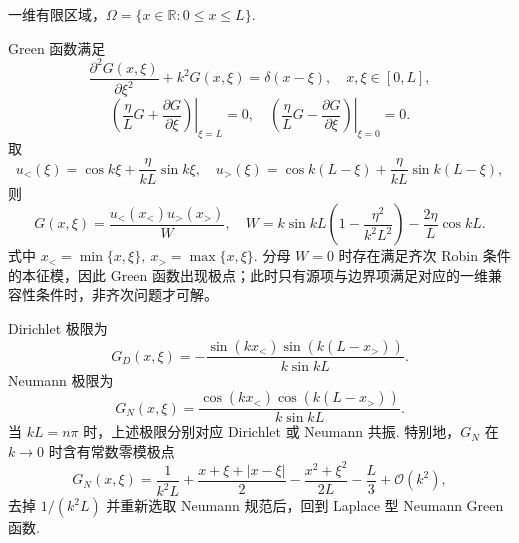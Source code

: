 \begin{example}
	一维有限区域，\(\Omega=\{x\in\mathbb{R}:0\leq x\leq L\}\).
	
	Green 函数满足
	\begin{equation*}
		\frac{\partial^2G(x,\xi)}{\partial\xi^2}+k^2G(x,\xi)=\delta(x-\xi),\quad x,\xi\in[0,L],
	\end{equation*}
	\begin{equation*}
		\left.\left(\frac{\eta}{L}G+\frac{\partial G}{\partial\xi}\right)\right|_{\xi=L}=0,
		\quad
		\left.\left(\frac{\eta}{L}G-\frac{\partial G}{\partial\xi}\right)\right|_{\xi=0}=0.
	\end{equation*}
	取
	\begin{equation*}
		u_<(\xi)=\cos k\xi+\frac{\eta}{kL}\sin k\xi,
		\quad
		u_>(\xi)=\cos k(L-\xi)+\frac{\eta}{kL}\sin k(L-\xi),
	\end{equation*}
	则
	\begin{equation*}
		G(x,\xi)=\frac{u_<(x_<)u_>(x_>)}{W},
		\quad
		W=k\sin kL\left(1-\frac{\eta^2}{k^2L^2}\right)-\frac{2\eta}{L}\cos kL.
	\end{equation*}
	式中 \(x_<=\min\{x,\xi\},\ x_>=\max\{x,\xi\}\). 分母 \(W=0\) 时存在满足齐次 Robin 条件的本征模，因此 Green 函数出现极点；此时只有源项与边界项满足对应的一维兼容性条件时，非齐次问题才可解。
	
	Dirichlet 极限为
	\begin{equation*}
		G_D(x,\xi)=-\frac{\sin(kx_<)\sin(k(L-x_>))}{k\sin kL}.
	\end{equation*}
	Neumann 极限为
	\begin{equation*}
		G_N(x,\xi)=\frac{\cos(kx_<)\cos(k(L-x_>))}{k\sin kL}.
	\end{equation*}
	当 \(kL=n\pi\) 时，上述极限分别对应 Dirichlet 或 Neumann 共振. 特别地，\(G_N\) 在 \(k\to0\) 时含有常数零模极点
	\begin{equation*}
		G_N(x,\xi)=\frac{1}{k^2L}+\frac{x+\xi+|x-\xi|}{2}-\frac{x^2+\xi^2}{2L}-\frac{L}{3}+\mathcal{O}(k^2),
	\end{equation*}
	去掉 \(1/(k^2L)\) 并重新选取 Neumann 规范后，回到 Laplace 型 Neumann Green 函数.
\end{example}

